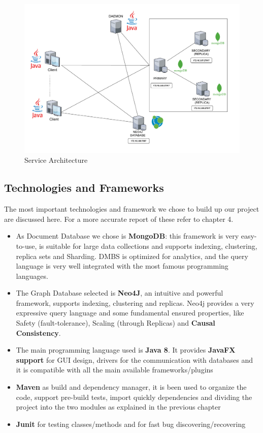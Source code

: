 \begin{figure}[H]
	\centering
	\includegraphics[width=\textwidth]{img/schema2.pdf}
	\caption{Service Architecture}
\end{figure}


\subsection{Technologies and Frameworks}
The most important technologies and framework we chose to build up our project are discussed here. For a more accurate report of these refer to chapter 4.
\begin{itemize}
\item As Document Database we chose is \textbf{MongoDB}: this framework is very easy-to-use, is suitable for large data collections and supports indexing, clustering, replica sets and Sharding. DMBS is optimized for analytics, and the query language is very well integrated with the most famous programming languages.
\item The Graph Database selected is \textbf{Neo4J}, an intuitive and powerful framework, supports indexing, clustering and replicas. Neo4j provides a very expressive query language and some fundamental ensured properties, like Safety (fault-tolerance), Scaling (through Replicas) and \textbf{Causal Consistency}.
\item The main programming language used is \textbf{Java 8}. It provides \textbf{JavaFX support} for GUI design, drivers for the communication with databases and it is compatible with all the main available frameworks/plugins
\item \textbf{Maven} as build and dependency manager, it is been used to organize the code, support pre-build tests, import quickly dependencies and dividing the project into the two modules as explained in the previous chapter
\item \textbf{Junit} for testing classes/methods and for fast bug discovering/recovering    
\end{itemize}
